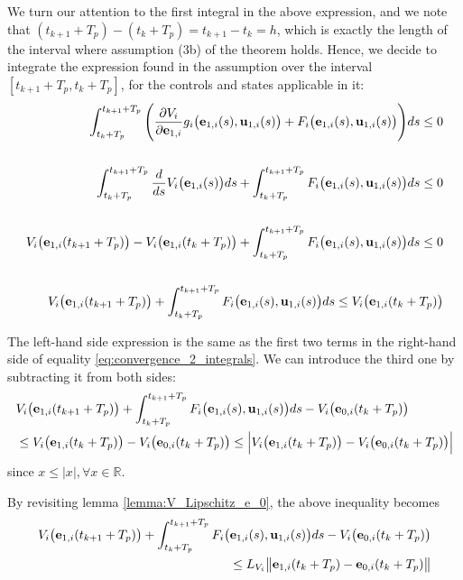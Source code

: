 \begin{gg_box}
  We turn our attention to the first integral in the above expression, and we
  note that $(t_{k+1} + T_p) - (t_k + T_p) = t_{k+1} - t_k = h$, which is exactly the
  length of the interval where assumption (3b) of the theorem holds. Hence,
  we decide to integrate the expression found in the assumption over the
  interval $[t_{k+1} + T_p, t_k + T_p]$, for the controls and states applicable
  in it:
  \begin{align}
    \int_{t_k + T_p}^{t_{k+1} + T_p} \Bigg(\dfrac{\partial V_i}{\partial \bm{\mathbf{e}}_{1,i}} g_i\big(\bm{\mathbf{e}}_{1,i}(s), \bm{\mathbf{u}}_{1,i}(s)\big)
    + F_i\big(\bm{\mathbf{e}}_{1,i}(s), \bm{\mathbf{u}}_{1,i}(s)\big)\Bigg) ds \leq 0 \\\\
    \int_{t_k + T_p}^{t_{k+1} + T_p} \dfrac{d}{ds} V_i\big(\bm{\mathbf{e}}_{1,i}(s)\big) d s
    + \int_{t_k + T_p}^{t_{k+1} + T_p} F_i\big(\bm{\mathbf{e}}_{1,i}(s), \bm{\mathbf{u}}_{1,i}(s)\big) ds \leq 0 \\\\
    V_i\big(\bm{\mathbf{e}}_{1,i}(t_{k+1} + T_p)\big) - V_i\big(\bm{\mathbf{e}}_{1,i}(t_k + T_p)\big)
    + \int_{t_k + T_p}^{t_{k+1} + T_p} F_i\big(\bm{\mathbf{e}}_{1,i}(s), \bm{\mathbf{u}}_{1,i}(s)\big) ds \leq 0 \\\\
    V_i\big(\bm{\mathbf{e}}_{1,i}(t_{k+1} + T_p)\big)
    + \int_{t_k + T_p}^{t_{k+1} + T_p} F_i\big(\bm{\mathbf{e}}_{1,i}(s), \bm{\mathbf{u}}_{1,i}(s)\big) ds \leq V_i\big(\bm{\mathbf{e}}_{1,i}(t_k + T_p)\big)
  \end{align}

  The left-hand side expression is the same as the first two terms in the
  right-hand side of equality \eqref{eq:convergence_2_integrals}. We can
  introduce the third one by subtracting it from both sides:
  \begin{align}
    &V_i\big(\bm{\mathbf{e}}_{1,i}(t_{k+1} + T_p)\big)
    + \int_{t_k + T_p}^{t_{k+1} + T_p} F_i\big(\bm{\mathbf{e}}_{1,i}(s), \bm{\mathbf{u}}_{1,i}(s)\big) ds
    - V_i\big(\bm{\mathbf{e}}_{0,i}(t_k + T_p)\big) \\
    &\leq V_i\big(\bm{\mathbf{e}}_{1,i}(t_k + T_p)\big)
    - V_i\big(\bm{\mathbf{e}}_{0,i}(t_k + T_p)\big)
    \leq \Big|V_i\big(\bm{\mathbf{e}}_{1,i}(t_k + T_p)\big)
    - V_i\big(\bm{\mathbf{e}}_{0,i}(t_k + T_p)\big)\Big|
  \end{align}
  since $x \leq |x|, \forall x \in \mathbb{R}$.

  By revisiting lemma \eqref{lemma:V_Lipschitz_e_0}, the above inequality
  becomes
  \begin{align}
    V_i\big(\bm{\mathbf{e}}_{1,i}(t_{k+1} + T_p)\big)
    + \int_{t_k + T_p}^{t_{k+1} + T_p} F_i\big(\bm{\mathbf{e}}_{1,i}(s), \bm{\mathbf{u}}_{1,i}(s)\big) ds
    - V_i\big(\bm{\mathbf{e}}_{0,i}(t_k + T_p)\big) \\
    \leq L_{V_i} \big\|\bm{\mathbf{e}}_{1,i}(t_k + T_p) - \bm{\mathbf{e}}_{0,i}(t_k + T_p)\big\|
  \end{align}


\end{gg_box}
